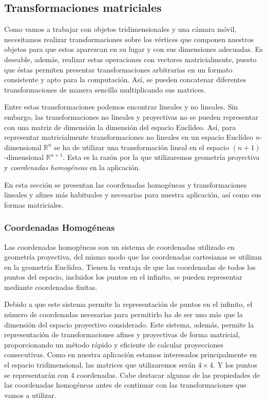 \subsection{Transformaciones matriciales}
\label{makereference5.4.1}

Como vamos a trabajar con objetos tridimensionales y una cámara móvil,
necesitamos realizar transformaciones sobre los vértices que componen nuestros
objetos para que estos aparezcan en su lugar y con sus dimensiones adecuadas.
Es deseable, además, realizar estas operaciones con vectores matricialmente,
puesto que éstas permiten presentar transformaciones arbitrarias en un
formato consistente y apto para la computación. Así, se pueden concatenar
diferentes transformaciones de manera sencilla multiplicando sus matrices. 

Entre estas transformaciones podemos encontrar lineales y no lineales. Sin
embargo, las transformaciones no lineales y proyectivas no se pueden representar
con una matriz de dimensión la dimensión del espacio Euclídeo. Así, para
representar matricialmente transformaciones no lineales en un espacio Euclídeo
$n$-dimensional $\mathbb{R}^n$ se ha de utilizar una transformación lineal en el
espacio $(n+1)$-dimensional $\mathbb{R}^{n+1}$. Esta es la razón por la que
utilizaremos geometría proyectiva y \textit{coordenadas homogéneas} en la
aplicación.

En esta sección se presentan las coordenadas homogéneas y transformaciones
lineales y afines más habituales y necesarias para nuestra aplicación, así como
sus formas matriciales. 

\subsubsection{Coordenadas Homogéneas}
\label{ref:HomogeneousCoordinates}

Las coordenadas homogéneas son un sistema de coordenadas utilizado en geometría
proyectiva, del mismo modo que las coordenadas cartesianas se utilizan en la
geometría Euclídea. Tienen la ventaja de que las coordenadas de todos los puntos
del espacio, incluidos los puntos en el infinito, se pueden representar mediante
coordenadas finitas.

Debido a que este sistema permite la representación de puntos en el infinito, el
número de coordenadas necesarias para permitirlo ha de ser uno más que la
dimensión del espacio proyectivo considerado. Este sistema, además, permite la
representación de transformaciones afines y proyectivas de forma matricial,
proporcionando un método rápido y eficiente de calcular proyecciones
consecutivas. Como en nuestra aplicación estamos interesados principalmente en
el espacio tridimensional, las matrices que utilizaremos serán $4 \times 4$. Y
los puntos se representarán con $4$ coordenadas. Cabe destacar algunas de las
propiedades de las coordenadas homogéneas antes de continuar con las
transformaciones que vamos a utilizar.

